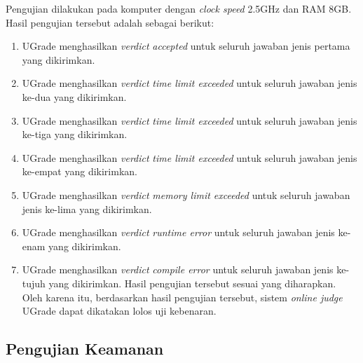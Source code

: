\par Pengujian dilakukan pada komputer dengan \textit{clock speed} 2.5GHz dan RAM 8GB. Hasil pengujian tersebut adalah sebagai berikut:
\begin{enumerate}
	\item UGrade menghasilkan \textit{verdict} \textit{accepted} untuk seluruh jawaban jenis pertama yang dikirimkan.
	\item UGrade menghasilkan \textit{verdict} \textit{time limit exceeded} untuk seluruh jawaban jenis ke-dua yang dikirimkan.
	\item UGrade menghasilkan \textit{verdict} \textit{time limit exceeded} untuk seluruh jawaban jenis ke-tiga yang dikirimkan.
	\item UGrade menghasilkan \textit{verdict} \textit{time limit exceeded} untuk seluruh jawaban jenis ke-empat yang dikirimkan.
	\item UGrade menghasilkan \textit{verdict} \textit{memory limit exceeded} untuk seluruh jawaban jenis ke-lima yang dikirimkan.
	\item UGrade menghasilkan \textit{verdict} \textit{runtime error} untuk seluruh jawaban jenis ke-enam yang dikirimkan.
	\item UGrade menghasilkan \textit{verdict} \textit{compile error} untuk seluruh jawaban jenis ke-tujuh yang dikirimkan.
Hasil pengujian tersebut sesuai yang diharapkan. Oleh karena itu, berdasarkan hasil pengujian tersebut, sistem \textit{online judge} UGrade dapat dikatakan lolos uji kebenaran.

\end{enumerate}

\subsection{Pengujian Keamanan}

